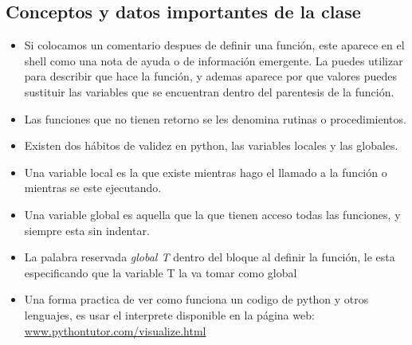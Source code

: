 \documentclass{book}
\begin{document}
	\subsection {Conceptos y datos importantes de la clase}
	\begin{itemize}
		\item Si colocamos un comentario despues de definir una función, este aparece en el shell como una nota de ayuda o de información emergente. La puedes utilizar para describir que hace la función, y ademas aparece por que valores puedes sustituir las variables que se encuentran dentro del parentesis de la función.
		\item Las funciones que no tienen retorno se les denomina rutinas o procedimientos.
		\item Existen dos hábitos de validez en python, las variables locales y las globales.
		\item Una variable local es la que existe mientras hago el llamado a la función o mientras se este ejecutando.
		\item Una variable global es aquella que la que tienen acceso todas las funciones, y siempre esta sin indentar.
		\item La palabra reservada \textit{global T} dentro del bloque al definir la función, le esta especificando que la variable T la va tomar como global
		\item Una forma practica de ver como funciona un codigo de python y otros lenguajes, es usar el interprete disponible en la página web: \url{www.pythontutor.com/visualize.html}
		
	\end{itemize}
	
	
	
\end{document}

